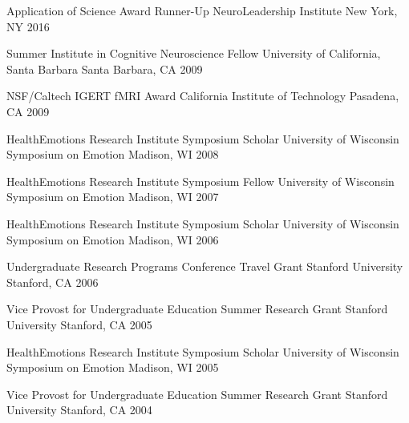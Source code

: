 \begin{cventries}
{    \cventry
      {Application of Science Award Runner-Up}
      {NeuroLeadership Institute}
      {New York, NY}
      {2016}
      {}

    \cventry
      {Summer Institute in Cognitive Neuroscience Fellow}
      {University of California, Santa Barbara}
      {Santa Barbara, CA}
      {2009}
      {}

    \cventry
      {NSF/Caltech IGERT fMRI Award}
      {California Institute of Technology}
      {Pasadena, CA}
      {2009}
      {}

    \cventry
      {HealthEmotions Research Institute Symposium Scholar}
      {University of Wisconsin Symposium on Emotion}
      {Madison, WI}
      {2008}
      {}

    \cventry
      {HealthEmotions Research Institute Symposium Fellow}
      {University of Wisconsin Symposium on Emotion}
      {Madison, WI}
      {2007}
      {}

    \cventry
      {HealthEmotions Research Institute Symposium Scholar}
      {University of Wisconsin Symposium on Emotion}
      {Madison, WI}
      {2006}
      {}

    \cventry
      {Undergraduate Research Programs Conference Travel Grant}
      {Stanford University}
      {Stanford, CA}
      {2006}
      {}

    \cventry
      {Vice Provost for Undergraduate Education Summer Research Grant}
      {Stanford University}
      {Stanford, CA}
      {2005}
      {}

    \cventry
      {HealthEmotions Research Institute Symposium Scholar}
      {University of Wisconsin Symposium on Emotion}
      {Madison, WI}
      {2005}
      {}

    \cventry
      {Vice Provost for Undergraduate Education Summer Research Grant}
      {Stanford University}
      {Stanford, CA}
      {2004}
      {}

  }{}

\end{cventries}